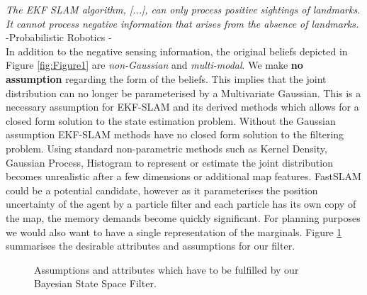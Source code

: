{\quote \textit{The EKF SLAM algorithm, [...], can only process positive sightings of landmarks. It cannot process negative information
that arises from the absence of landmarks. } -Probabilistic Robotics \cite[p.313]{Thrun_Burgard_Fox_2005}-}\\[0.01cm]

In addition to the negative sensing information, the original beliefs depicted in Figure \ref{fig:Figure1} are \textit{non-Gaussian}
and \textit{multi-modal}. We make \textbf{no assumption} regarding the form of the beliefs. This implies that the joint distribution 
can no longer be parameterised by a Multivariate Gaussian. 
This is a necessary assumption for EKF-SLAM and its derived methods which allows for a closed form solution to the state estimation problem. Without the 
Gaussian assumption EKF-SLAM methods have no closed form solution to the filtering problem. 
Using standard non-parametric methods such as Kernel Density, Gaussian Process, Histogram to represent or estimate the joint distribution becomes
unrealistic after a few dimensions or additional map features. 
FastSLAM could be a potential candidate, however as it parameterises the position uncertainty of the agent by a particle filter and each
particle has its own copy of the map, the memory demands become quickly significant.  For planning purposes we would also want to have a 
single representation of the marginals. Figure \ref{fig:ch5_assmuptions} summarises the desirable attributes and assumptions for our filter.

\begin{figure}
\centering
{}%
\caption{Assumptions and attributes which have to be fulfilled by our Bayesian State Space Filter. }
 \label{fig:ch5_assmuptions}
\end{figure}

